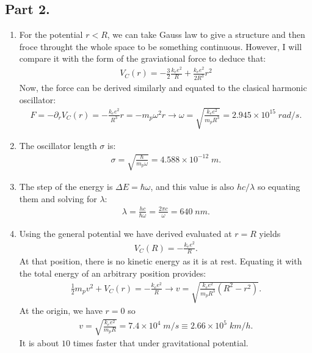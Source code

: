 \documentclass[letterpaper,11pt,twoside]{article}
\begin{document}
\subsection*{Part 2.}
\begin{enumerate}[itemsep=0pt,topsep=0pt,label=\alph*),start=2]
  \item For the potential $r<R$, we can take Gauss law to give a structure and then froce throught the whole space to be something continuous. However,
  I will compare it with the form of the graviational force to deduce that:
  \begin{align*}
    V_C(r)=-\frac{3}{2}\frac{k_ee^2}{R}+\frac{k_ee^2}{2R^3}r^2
  \end{align*}
  Now, the force can be derived similarly and equated to the clasical harmonic oscillator:
  \begin{align*}
    F=-\partial_rV_C(r)=-\frac{k_ee^2}{R^3}r=-m_p\omega^2r\longrightarrow\omega=\sqrt{\frac{k_ee^2}{m_pR^3}}=2.945\times10^{15}\;rad/s.
  \end{align*}
  \item The oscillator length $\sigma$ is:
  \begin{align*}
    \sigma=\sqrt{\frac{\hbar}{m_p\omega}}=4.588\times10^{-12}\;m.
  \end{align*}
  \item The step of the energy is $\Delta E=\hbar\omega$, and this value is also $hc/\lambda$ so equating them and solving for $\lambda$:
  \begin{align*}
    \lambda=\frac{hc}{\hbar\omega}=\frac{2\pi c}{\omega}=640\;nm.
  \end{align*}
  \item Using the general potential we have derived evaluated at $r=R$ yields 
  \begin{align*}
    V_C(R)=-\frac{k_ee^2}{R}.
  \end{align*}
  At that position, there is no kinetic energy as it is at rest. Equating it with the total energy of an arbitrary position provides:
  \begin{align*}
    \frac{1}{2}m_pv^2+V_C(r)=-\frac{k_ee^2}{R}\longrightarrow v=\sqrt{\frac{k_ee^2}{m_pR^3}(R^2-r^2)}.
  \end{align*}
  At the origin, we have $r=0$ so 
  \begin{align*}
    v=\sqrt{\frac{k_ee^2}{m_pR}}=7.4\times10^4\;m/s\equiv2.66\times10^5\;km/h.
  \end{align*}
  It is about $10$ times faster that under gravitational potential.
\end{enumerate}




%
\end{document}
